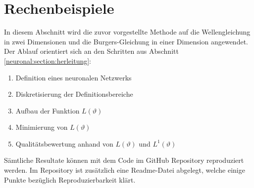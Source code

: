 %
%
%
%

\section{Rechenbeispiele}\label{neuronal:section:rechenbeispiel}

In diesem Abschnitt wird die zuvor vorgestellte Methode auf die Wellengleichung in zwei Dimensionen und die Burgers-Gleichung in einer Dimension angewendet.
Der Ablauf orientiert sich an den Schritten aus Abschnitt \ref{neuronal:section:herleitung}:
\begin{enumerate}
    \item Definition eines neuronalen Netzwerks
    \item Diskretisierung der Definitionsbereiche
    \item Aufbau der Funktion $L(\vartheta)$
    \item Minimierung von $L(\vartheta)$
    \item Qualitätsbewertung anhand von $L(\vartheta)$ und $L^1(\vartheta)$
\end{enumerate}

Sämtliche Resultate können mit dem Code im GitHub Repository \cite{neuronal:github_source_code} reproduziert werden.
Im Repository ist zusätzlich eine Readme-Datei abgelegt, welche einige Punkte bezüglich Reproduzierbarkeit klärt.

